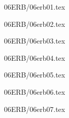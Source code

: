 \documentclass[9pt, xcolor={svgnames, x11names},professionalfonts]{beamer}
\def\scale{1}
\begin{document}

\begin{frame}{06ERB/06erb01.tex}	
	\def\scale{0.55}
	\tcb{
		\centering
		
	}
\end{frame}


\begin{frame}{06ERB/06erb02.tex}
		\def\scale{0.55}
		\tcb{
			
		}	
\end{frame}


\begin{frame}{06ERB/06erb03.tex}	
	\def\scale{0.55}
	\tcb{
		\centering
		
	}
\end{frame}


\begin{frame}{06ERB/06erb04.tex}
	\def\scale{0.75}
	\tcb{
		\centering
		
	}			
\end{frame}


\begin{frame}{06ERB/06erb05.tex}
	\def\scale{0.675}
	\tcb{
		\centering
		
	}			
\end{frame}


\begin{frame}{06ERB/06erb06.tex}	
		\def\scale{1}
		\tcb{
			
		}		
\end{frame}


\begin{frame}{06ERB/06erb07.tex}	
		\def\scale{0.65}
		\tcb{
			
		}		
\end{frame}
\end{document}
